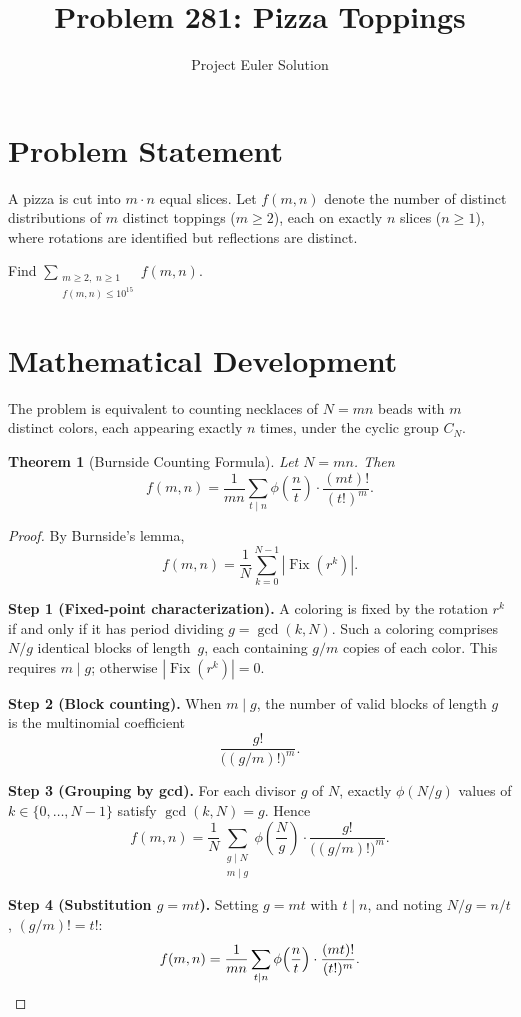 \documentclass[12pt]{article}
\title{Problem 281: Pizza Toppings}
\author{Project Euler Solution}
\date{}
\newtheorem{theorem}{Theorem}
\begin{document}
\maketitle

\section{Problem Statement}

A pizza is cut into $m \cdot n$ equal slices. Let $f(m,n)$ denote the number of distinct distributions of $m$ distinct toppings ($m \ge 2$), each on exactly $n$ slices ($n \ge 1$), where rotations are identified but reflections are distinct.

Find $\displaystyle\sum_{\substack{m \ge 2,\; n \ge 1 \\ f(m,n) \le 10^{15}}} f(m,n)$.

\section{Mathematical Development}

The problem is equivalent to counting necklaces of $N = mn$ beads with $m$ distinct colors, each appearing exactly $n$ times, under the cyclic group $C_N$.

\begin{theorem}[Burnside Counting Formula]
Let $N = mn$. Then
\[
f(m,n) = \frac{1}{mn} \sum_{t \mid n} \phi\!\left(\frac{n}{t}\right) \cdot \frac{(mt)!}{(t!)^m}.
\]
\end{theorem}

\begin{proof}
By Burnside's lemma,
\[
f(m,n) = \frac{1}{N} \sum_{k=0}^{N-1} |\operatorname{Fix}(r^k)|.
\]

\textbf{Step 1 (Fixed-point characterization).} A coloring is fixed by the rotation $r^k$ if and only if it has period dividing $g = \gcd(k,N)$. Such a coloring comprises $N/g$ identical blocks of length~$g$, each containing $g/m$ copies of each color. This requires $m \mid g$; otherwise $|\operatorname{Fix}(r^k)| = 0$.

\textbf{Step 2 (Block counting).} When $m \mid g$, the number of valid blocks of length $g$ is the multinomial coefficient
\[
\frac{g!}{\bigl((g/m)!\bigr)^m}.
\]

\textbf{Step 3 (Grouping by gcd).} For each divisor $g$ of $N$, exactly $\phi(N/g)$ values of $k \in \{0,\ldots,N-1\}$ satisfy $\gcd(k,N) = g$. Hence
\[
f(m,n) = \frac{1}{N} \sum_{\substack{g \mid N \\ m \mid g}} \phi\!\left(\frac{N}{g}\right) \cdot \frac{g!}{\bigl((g/m)!\bigr)^m}.
\]

\textbf{Step 4 (Substitution $g = mt$).} Setting $g = mt$ with $t \mid n$, and noting $N/g = n/t$, $(g/m)! = t!$:
\[
f(m,n) = \frac{1}{mn} \sum_{t \mid n} \phi\!\left(\frac{n}{t}\right) \cdot \frac{(mt)!}{(t!)^m}. \qedhere
\]
\end{proof}
\end{document}
